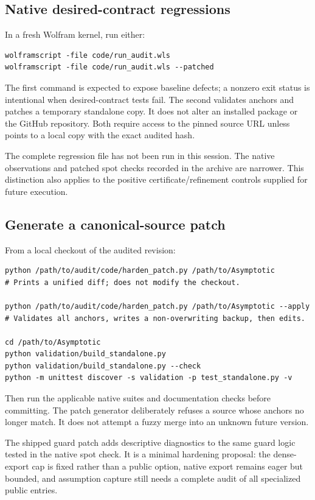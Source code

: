 \documentclass[11pt,a4paper]{article}
\newcommand{\code}[1]{\texttt{\detokenize{#1}}}
\begin{document}
\subsection{Native desired-contract regressions}
In a fresh Wolfram kernel, run either:
\begin{lstlisting}
wolframscript -file code/run_audit.wls
wolframscript -file code/run_audit.wls --patched
\end{lstlisting}
The first command is expected to expose baseline defects; a nonzero exit status is intentional when desired-contract tests fail. The second validates anchors and patches a temporary standalone copy. It does not alter an installed package or the GitHub repository. Both require access to the pinned source URL unless \code{ASYMPTOTIC_AUDIT_PACKAGE} points to a local copy with the exact audited hash.

The complete regression file has not been run in this session. The native observations and patched spot checks recorded in the archive are narrower. This distinction also applies to the positive certificate/refinement controls supplied for future execution.

\subsection{Generate a canonical-source patch}
From a local checkout of the audited revision:
\begin{lstlisting}
python /path/to/audit/code/harden_patch.py /path/to/Asymptotic
# Prints a unified diff; does not modify the checkout.

python /path/to/audit/code/harden_patch.py /path/to/Asymptotic --apply
# Validates all anchors, writes a non-overwriting backup, then edits.

cd /path/to/Asymptotic
python validation/build_standalone.py
python validation/build_standalone.py --check
python -m unittest discover -s validation -p test_standalone.py -v
\end{lstlisting}
Then run the applicable native suites and documentation checks before committing. The patch generator deliberately refuses a source whose anchors no longer match. It does not attempt a fuzzy merge into an unknown future version.

The shipped guard patch adds descriptive diagnostics to the same guard logic tested in the native spot check. It is a minimal hardening proposal: the dense-export cap is fixed rather than a public option, native export remains eager but bounded, and assumption capture still needs a complete audit of all specialized public entries.
\end{document}
